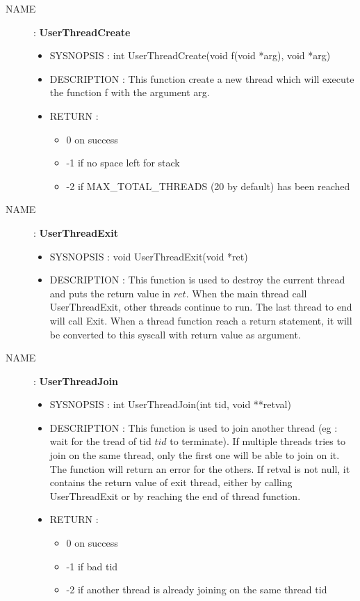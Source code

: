 \begin{description}
    \item [NAME] : \textbf{UserThreadCreate}
        \begin{itemize}
            \item SYSNOPSIS : int UserThreadCreate(void f(void *arg), void *arg)
            \item DESCRIPTION :
                This function create a new thread which will execute the function f with the
                argument arg.
            \item RETURN :
                \begin{itemize}
                    \item 0 on success
                    \item -1 if no space left for stack
                    \item -2 if MAX\_TOTAL\_THREADS (20 by default) has been reached
                \end{itemize}
        \end{itemize}


    \item [NAME] : \textbf{UserThreadExit}
        \begin{itemize}
            \item SYSNOPSIS : void UserThreadExit(void *ret)
            \item DESCRIPTION :
                This function is used to destroy the current thread and puts the return value in
                $ret$.
                When the main thread call UserThreadExit, other threads continue to
                run. The last thread to end will call Exit.
                When a thread function reach a return statement, it will be converted
                to this syscall with return value as argument.
        \end{itemize}

    \item [NAME] : \textbf{UserThreadJoin}
        \begin{itemize}
            \item SYSNOPSIS : int UserThreadJoin(int tid, void **retval)
            \item DESCRIPTION :
                This function is used to join another thread (eg : wait for the tread
                of tid $tid$ to terminate). If multiple threads tries to join on the same
                thread, only the first one will be able to join on it. The function
                will return an error for the others.
                If retval is not null, it contains the return value of exit thread,
                either by calling UserThreadExit or by reaching the end of thread function.
            \item RETURN :
                \begin{itemize}
                    \item 0 on success
                    \item -1 if bad tid
                    \item -2 if another thread is already joining on the same thread tid
                \end{itemize}
        \end{itemize}


\end{description}
